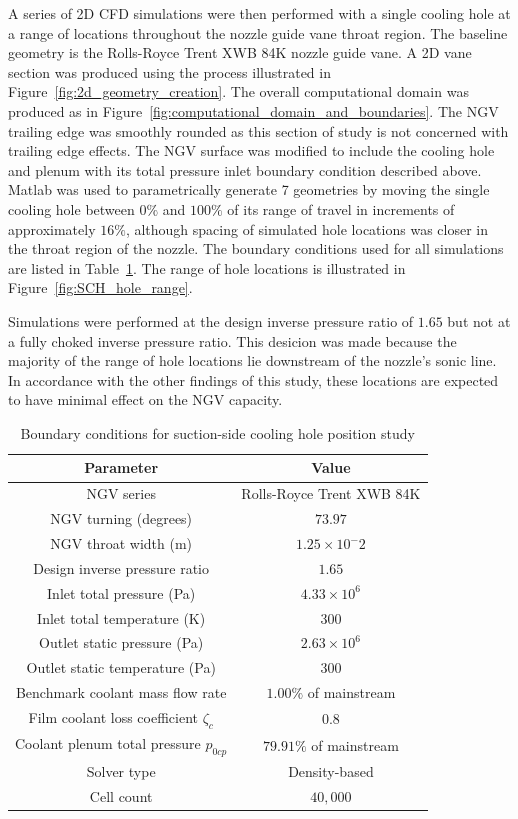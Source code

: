 \documentclass[a4paper, 11pt, oneside]{report}
\begin{document}
A series of 2D CFD simulations were then performed with a single cooling hole at a range of locations throughout the nozzle guide vane throat region. The baseline geometry is the Rolls-Royce Trent XWB 84K nozzle guide vane. A 2D vane section was produced using the process illustrated in Figure~\ref{fig:2d_geometry_creation}. The overall computational domain was produced as in Figure~\ref{fig:computational_domain_and_boundaries}. The NGV trailing edge was smoothly rounded as this section of study is not concerned with trailing edge effects. The NGV surface was modified to include the cooling hole and plenum with its total pressure inlet boundary condition described above. Matlab was used to parametrically generate 7 geometries by moving the single cooling hole between $0\%$ and $100\%$ of its range of travel in increments of approximately $16\%$, although spacing of simulated hole locations was closer in the throat region of the nozzle. The boundary conditions used for all simulations are listed in Table~\ref{SCH_parameters}. The range of hole locations is illustrated in Figure~\ref{fig:SCH_hole_range}.

Simulations were performed at the design inverse pressure ratio of $1.65$ but not at a fully choked inverse pressure ratio. This desicion was made because the majority of the range of hole locations lie downstream of the nozzle's sonic line. In accordance with the other findings of this study, these locations are expected to have minimal effect on the NGV capacity.

\begin{table}[H]
\caption{Boundary conditions for suction-side cooling hole position study}
\label{SCH_parameters}
\begin{center}
\begin{tabular}{|c|c|}
\hline
Parameter & Value\\
\hline
NGV series & Rolls-Royce Trent XWB 84K\\
NGV turning (degrees) & $73.97$\\
NGV throat width (m) & $1.25 \times 10^-2$\\
Design inverse pressure ratio & $1.65$\\
Inlet total pressure (Pa) & $4.33 \times 10^6$\\
Inlet total temperature (K) & $300$\\
Outlet static pressure (Pa) & $2.63 \times 10^6$\\
Outlet static temperature (Pa) & $300$\\
Benchmark coolant mass flow rate & $1.00\%$ of mainstream\\
Film coolant loss coefficient $\zeta_c$ & $0.8$\\
Coolant plenum total pressure $p_{0cp}$ & $79.91\%$ of mainstream\\
Solver type & Density-based\\
Cell count & $40,000$\\
\hline
\end{tabular}
\end{center}
\end{table}
\end{document}

